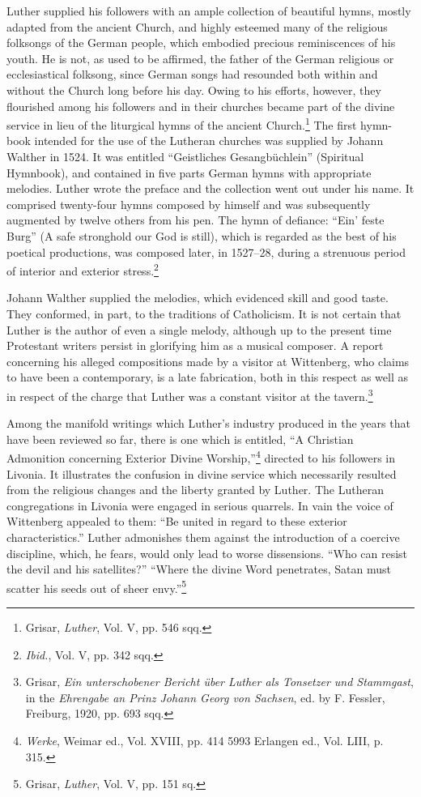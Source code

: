 Luther supplied his followers with an ample collection of beautiful hymns,
mostly adapted from the ancient Church, and highly
esteemed many of the religious folksongs of the German people,
which embodied precious reminiscences of his youth. He is not, as
used to be affirmed, the father of the German religious or ecclesiastical
folksong, since German songs had resounded both within
and without the Church long before his day. Owing to his efforts,
however, they flourished among his followers and in their churches
became part of the divine service in lieu of the liturgical hymns
of the ancient Church.\footnote{Grisar, \textit{Luther}, Vol. V, pp. 546 sqq.}
The first hymn-book intended for the
use of the Lutheran churches was supplied by Johann Walther in
1524. It was entitled “Geistliches Gesangbüchlein” (Spiritual Hymnbook),
and contained in five parts German hymns with appropriate
melodies. Luther wrote the preface and the collection went out
under his name. It comprised twenty-four hymns composed by himself and
was subsequently augmented by twelve others from his pen.
The hymn of defiance: “Ein’ feste Burg” (A safe stronghold our God
is still), which is regarded as the best of his poetical productions,
was composed later, in 1527--28, during a strenuous period of interior
and exterior stress.\footnote{\textit{Ibid.}, Vol. V, pp. 342 sqq.}

Johann Walther supplied the melodies, which evidenced skill and
good taste. They conformed, in part, to the traditions of Catholicism.
It is not certain that Luther is the author of even a single melody,
although up to the present time Protestant writers persist in glorifying
him as a musical composer. A report concerning his alleged compositions
made by a visitor at Wittenberg, who claims to have been a
contemporary, is a late fabrication, both in this respect as well as in
respect of the charge that Luther was a constant visitor at the
tavern.\footnote
{Grisar, \textit{Ein unterschobener Bericht über Luther als Tonsetzer und Stammgast}, in the
\textit{Ehrengabe an Prinz Johann Georg von Sachsen}, ed. by F. Fessler, Freiburg, 1920,
pp. 693 sqq.}

Among the manifold writings which Luther’s industry produced in
the years that have been reviewed so far, there is one which is entitled,
“A Christian Admonition concerning Exterior Divine Worship,”\footnote
{\textit{Werke}, Weimar ed., Vol. XVIII, pp. 414 5993 Erlangen ed., Vol. LIII, p. 315.}
directed to his followers in Livonia. It illustrates the confusion in
divine service which necessarily resulted from the religious
changes and the liberty granted by Luther. The Lutheran congregations
in Livonia were engaged in serious quarrels. In vain the voice
of Wittenberg appealed to them: “Be united in regard to these exterior
characteristics.” Luther admonishes them against the introduction of a
coercive discipline, which, he fears, would only lead to worse
dissensions. “Who can resist the devil and his satellites?” “Where the
divine Word penetrates, Satan must scatter his seeds out of sheer
envy.”\footnote{Grisar, \textit{Luther}, Vol. V, pp. 151 sq.}

